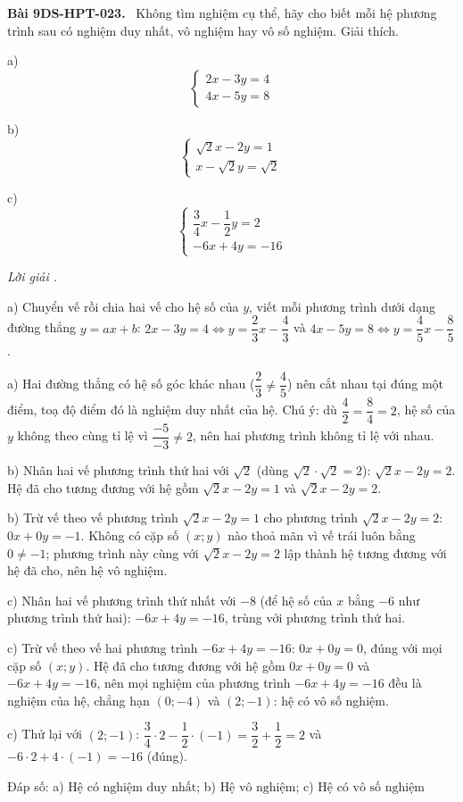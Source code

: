 \documentclass[12pt,a4paper]{article}
\newenvironment{problem}[1][]{\par\medskip\noindent\textbf{Bài #1.}\ }{\par}
\newenvironment{solution}[1][]{\par\noindent\textit{Lời giải #1.}\par}{\par}
\begin{document}
\begin{problem}[9DS-HPT-023]
Không tìm nghiệm cụ thể, hãy cho biết mỗi hệ phương trình sau có nghiệm duy nhất, vô nghiệm hay vô số nghiệm. Giải thích.

a) \[ \begin{cases} 2x - 3y = 4 \\ 4x - 5y = 8 \end{cases} \]

b) \[ \begin{cases} \sqrt{2}x - 2y = 1 \\ x - \sqrt{2}y = \sqrt{2} \end{cases} \]

c) \[ \begin{cases} \dfrac{3}{4}x - \dfrac{1}{2}y = 2 \\ -6x + 4y = -16 \end{cases} \]

\begin{solution}
a) Chuyển vế rồi chia hai vế cho hệ số của $y$, viết mỗi phương trình dưới dạng đường thẳng $y = ax + b$: $2x - 3y = 4 \Leftrightarrow y = \dfrac{2}{3}x - \dfrac{4}{3}$ và $4x - 5y = 8 \Leftrightarrow y = \dfrac{4}{5}x - \dfrac{8}{5}$.

a) Hai đường thẳng có hệ số góc khác nhau ($\dfrac{2}{3} \neq \dfrac{4}{5}$) nên cắt nhau tại đúng một điểm, toạ độ điểm đó là nghiệm duy nhất của hệ. Chú ý: dù $\dfrac{4}{2} = \dfrac{8}{4} = 2$, hệ số của $y$ không theo cùng tỉ lệ vì $\dfrac{-5}{-3} \neq 2$, nên hai phương trình không tỉ lệ với nhau.

b) Nhân hai vế phương trình thứ hai với $\sqrt{2}$ (dùng $\sqrt{2} \cdot \sqrt{2} = 2$): $\sqrt{2}x - 2y = 2$. Hệ đã cho tương đương với hệ gồm $\sqrt{2}x - 2y = 1$ và $\sqrt{2}x - 2y = 2$.

b) Trừ vế theo vế phương trình $\sqrt{2}x - 2y = 1$ cho phương trình $\sqrt{2}x - 2y = 2$: $0x + 0y = -1$. Không có cặp số $(x; y)$ nào thoả mãn vì vế trái luôn bằng $0 \neq -1$; phương trình này cùng với $\sqrt{2}x - 2y = 2$ lập thành hệ tương đương với hệ đã cho, nên hệ vô nghiệm.

c) Nhân hai vế phương trình thứ nhất với $-8$ (để hệ số của $x$ bằng $-6$ như phương trình thứ hai): $-6x + 4y = -16$, trùng với phương trình thứ hai.

c) Trừ vế theo vế hai phương trình $-6x + 4y = -16$: $0x + 0y = 0$, đúng với mọi cặp số $(x; y)$. Hệ đã cho tương đương với hệ gồm $0x + 0y = 0$ và $-6x + 4y = -16$, nên mọi nghiệm của phương trình $-6x + 4y = -16$ đều là nghiệm của hệ, chẳng hạn $(0; -4)$ và $(2; -1)$: hệ có vô số nghiệm.

c) Thử lại với $(2; -1)$: $\dfrac{3}{4} \cdot 2 - \dfrac{1}{2} \cdot (-1) = \dfrac{3}{2} + \dfrac{1}{2} = 2$ và $-6 \cdot 2 + 4 \cdot (-1) = -16$ (đúng).

Đáp số: a) $\boxed{\text{Hệ có nghiệm duy nhất}}$; b) $\boxed{\text{Hệ vô nghiệm}}$; c) $\boxed{\text{Hệ có vô số nghiệm}}$
\end{solution}
\end{problem}
\end{document}
